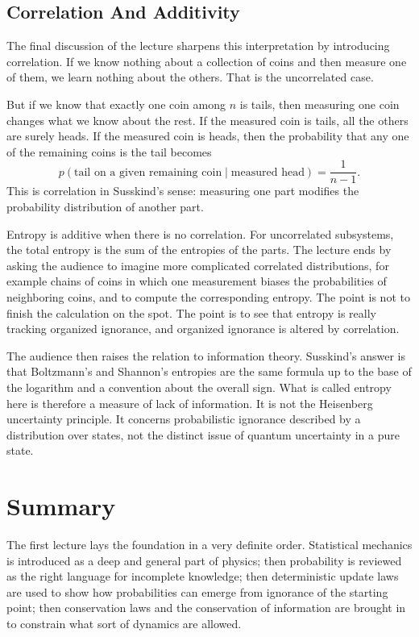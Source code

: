 \subsection{Correlation And Additivity}

The final discussion of the lecture sharpens this interpretation by introducing correlation. If we know nothing about a collection of coins and then measure one of them, we learn nothing about the others. That is the uncorrelated case.

But if we know that exactly one coin among \(n\) is tails, then measuring one coin changes what we know about the rest. If the measured coin is tails, all the others are surely heads. If the measured coin is heads, then the probability that any one of the remaining coins is the tail becomes
\begin{equation}
p(\text{tail on a given remaining coin}\mid \text{measured head})=\frac{1}{n-1}.
\end{equation}
This is correlation in Susskind's sense: measuring one part modifies the probability distribution of another part.

Entropy is additive when there is no correlation. For uncorrelated subsystems, the total entropy is the sum of the entropies of the parts. The lecture ends by asking the audience to imagine more complicated correlated distributions, for example chains of coins in which one measurement biases the probabilities of neighboring coins, and to compute the corresponding entropy. The point is not to finish the calculation on the spot. The point is to see that entropy is really tracking organized ignorance, and organized ignorance is altered by correlation.

The audience then raises the relation to information theory. Susskind's answer is that Boltzmann's and Shannon's entropies are the same formula up to the base of the logarithm and a convention about the overall sign. What is called entropy here is therefore a measure of lack of information. It is not the Heisenberg uncertainty principle. It concerns probabilistic ignorance described by a distribution over states, not the distinct issue of quantum uncertainty in a pure state.

\section{Summary}

The first lecture lays the foundation in a very definite order. Statistical mechanics is introduced as a deep and general part of physics; then probability is reviewed as the right language for incomplete knowledge; then deterministic update laws are used to show how probabilities can emerge from ignorance of the starting point; then conservation laws and the conservation of information are brought in to constrain what sort of dynamics are allowed.

